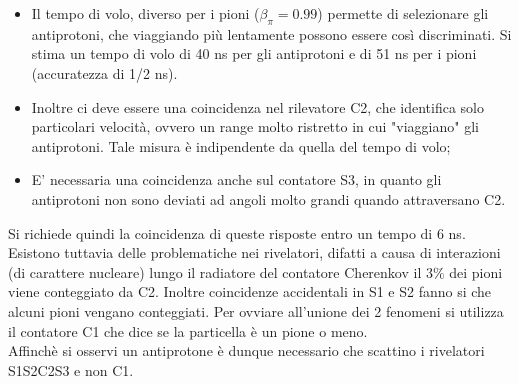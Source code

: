 \documentclass[twoside]{article}
\begin{document}
\begin{itemize}
\item Il tempo di volo, diverso per i pioni ($\beta_\pi= 0.99$) permette di selezionare gli antiprotoni, che viaggiando più lentamente possono essere così discriminati. Si stima un tempo di volo di 40 ns per gli antiprotoni e di 51 ns per i pioni (accuratezza di 1/2 ns).\\
\item Inoltre ci deve essere una coincidenza nel rilevatore C2, che identifica solo particolari velocità, ovvero un range molto ristretto in cui "viaggiano" gli antiprotoni. Tale misura è indipendente da quella del tempo di volo;
\item E' necessaria una coincidenza anche sul contatore S3, in quanto gli antiprotoni non sono deviati ad angoli molto grandi quando attraversano C2.
\end{itemize}
Si richiede quindi la coincidenza di queste risposte entro un tempo di 6 ns.\\
Esistono tuttavia delle problematiche nei rivelatori, difatti a causa di interazioni (di carattere nucleare) lungo il radiatore del contatore Cherenkov il 3$\%$ dei pioni viene conteggiato da C2. Inoltre coincidenze accidentali in S1 e S2 fanno si che alcuni pioni vengano conteggiati. Per ovviare all'unione dei 2 fenomeni si utilizza il contatore C1 che dice se la particella è un pione o meno.\\
Affinchè si osservi un antiprotone è dunque necessario che scattino i rivelatori S1S2C2S3 e non C1.\\
\end{document}
